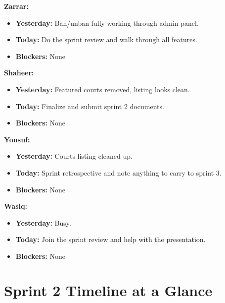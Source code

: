 \documentclass[12pt,a4paper]{article}
\begin{document}
\textbf{Zarrar:}
\begin{itemize}[noitemsep]
    \item \textbf{Yesterday:} Ban/unban fully working through admin panel.
    \item \textbf{Today:} Do the sprint review and walk through all features.
    \item \textbf{Blockers:} None
\end{itemize}

\textbf{Shaheer:}
\begin{itemize}[noitemsep]
    \item \textbf{Yesterday:} Featured courts removed, listing looks clean.
    \item \textbf{Today:} Finalize and submit sprint 2 documents.
    \item \textbf{Blockers:} None
\end{itemize}

\textbf{Yousuf:}
\begin{itemize}[noitemsep]
    \item \textbf{Yesterday:} Courts listing cleaned up.
    \item \textbf{Today:} Sprint retrospective and note anything to carry to sprint 3.
    \item \textbf{Blockers:} None
\end{itemize}

\textbf{Wasiq:}
\begin{itemize}[noitemsep]
    \item \textbf{Yesterday:} Busy.
    \item \textbf{Today:} Join the sprint review and help with the presentation.
    \item \textbf{Blockers:} None
\end{itemize}

\newpage

\section{Sprint 2 Timeline at a Glance}
\end{document}
